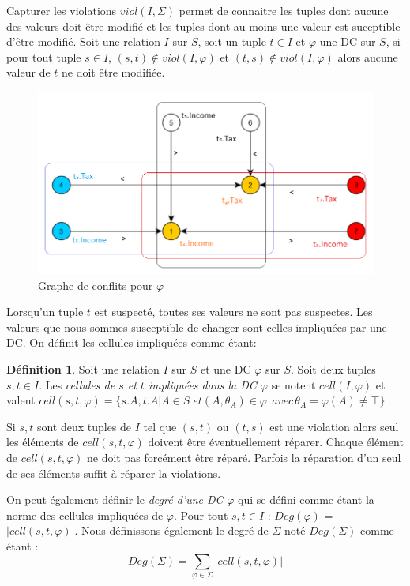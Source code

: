 \documentclass[letterpaper, 12pt]{report}
\theoremstyle{definition}
\newtheorem{mydef}{Définition}
\begin{document}
Capturer les violations $viol(I,\Sigma)$ permet de connaitre les tuples dont aucune des valeurs doit être modifié et les tuples dont au moins une valeur est suceptible d'être modifié. Soit une relation $I$ sur $S$, soit un tuple $t \in I$ et $\varphi$ une DC sur $S$, si pour tout tuple $s \in I$, $(s,t) \not \in viol(I,\varphi)$ et $(t,s) \not \in viol(I,\varphi)$ alors aucune valeur de $t$ ne doit être modifiée.\\

\begin{figure}
 \centering
 \includegraphics[scale=0.7]{img/grapht4.png}
 \caption{\label{grapht4} Graphe de conflits pour $\varphi$}
\end{figure}

Lorsqu'un tuple $t$ est suspecté, toutes ses valeurs ne sont pas suspectes. Les valeurs que nous sommes susceptible de changer sont celles impliquées par une DC. On définit les cellules impliquées comme étant:

\begin{mydef}
Soit une relation $I$ sur $S$ et une DC $\varphi$ sur $S$. Soit deux tuples $s,t \in I$. Les \emph{cellules de $s$ et $t$ impliquées dans la DC $\varphi$ } se notent $cell(I,\varphi)$ et valent $cell(s,t,\varphi) = \{s.A,t.A| A \in S\; et (A,\theta_A) \in \varphi\,\; avec\, \theta_A = \varphi(A) \not= \top \}$
\end{mydef}

Si $s,t$ sont deux tuples de $I$ tel que $(s,t)$ ou $(t,s)$ est une violation alors seul les éléments de $cell(s,t,\varphi)$ doivent être éventuellement réparer. Chaque élément de $cell(s,t,\varphi)$ ne doit pas forcément être réparé. Parfois la réparation d'un seul de ses éléments suffit à réparer la violations.

On peut également définir le \emph{degré d'une DC} $\varphi$ qui se défini comme étant la norme des cellules impliquées de $\varphi$. Pour tout $s,t \in I$ : $Deg(\varphi)$ = $ |cell(s,t,\varphi)|$. Nous définissons également le degré de $\Sigma$ noté $Deg(\Sigma)$ comme étant : $$Deg(\Sigma) = \sum_{\varphi \in \Sigma} |cell(s,t,\varphi)|$$
\end{document}
